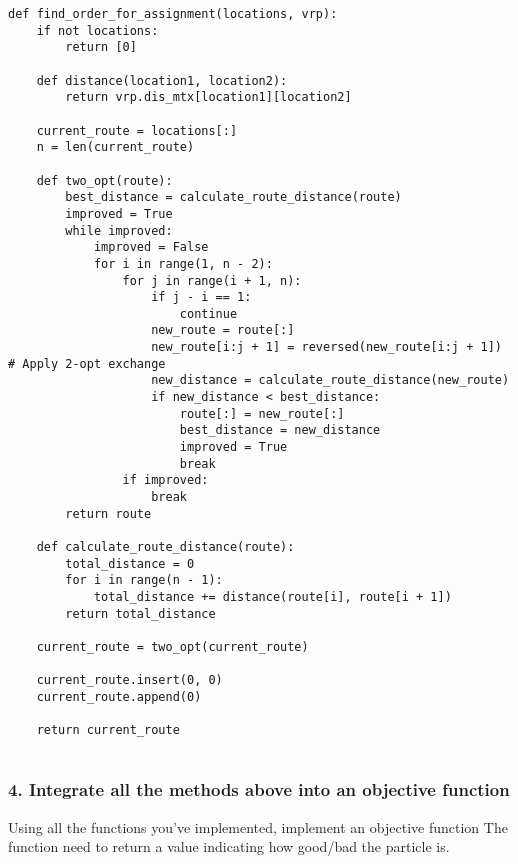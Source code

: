 \documentclass[letterpaper, 12pt]{article}
\begin{document}
\begin{lstlisting}
def find_order_for_assignment(locations, vrp):
    if not locations:
        return [0]  

    def distance(location1, location2):
        return vrp.dis_mtx[location1][location2]

    current_route = locations[:]
    n = len(current_route)

    def two_opt(route):
        best_distance = calculate_route_distance(route)
        improved = True
        while improved:
            improved = False
            for i in range(1, n - 2):
                for j in range(i + 1, n):
                    if j - i == 1:
                        continue
                    new_route = route[:]
                    new_route[i:j + 1] = reversed(new_route[i:j + 1])  # Apply 2-opt exchange
                    new_distance = calculate_route_distance(new_route)
                    if new_distance < best_distance:
                        route[:] = new_route[:]
                        best_distance = new_distance
                        improved = True
                        break
                if improved:
                    break
        return route

    def calculate_route_distance(route):
        total_distance = 0
        for i in range(n - 1):
            total_distance += distance(route[i], route[i + 1])
        return total_distance

    current_route = two_opt(current_route)

    current_route.insert(0, 0)
    current_route.append(0)

    return current_route


\end{lstlisting}

\subsubsection*{4. Integrate all the methods above into an objective function}
Using all the functions you've implemented, implement an objective function The function need to return a value indicating how good/bad the particle is. \\
\end{document}
